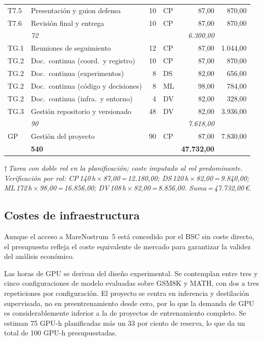 \documentclass[11pt,a4paper]{article}
\begin{document}
{\begin{tabularx}{\textwidth}{>{\ttfamily}l >{\raggedright\arraybackslash}X r l r r}
T7.5 & Presentación y guion defensa & 10 & CP & 87,00 & 870,00 \\
T7.6 & Revisión final y entrega & 10 & CP & 87,00 & 870,00 \\
\multicolumn{2}{r}{\textit{Subtotal F7}} & \textit{72} & & & \textit{6.300,00} \\
\addlinespace[1.5pt]
TG.1 & Reuniones de seguimiento & 12 & CP & 87,00 & 1.044,00 \\
TG.2 & Doc.\ continua (coord.\ y registro) & 10 & CP & 87,00 & 870,00 \\
TG.2 & Doc.\ continua (experimentos) & 8 & DS & 82,00 & 656,00 \\
TG.2 & Doc.\ continua (código y decisiones) & 8 & ML & 98,00 & 784,00 \\
TG.2 & Doc.\ continua (infra.\ y entorno) & 4 & DV & 82,00 & 328,00 \\
TG.3 & Gestión repositorio y versionado & 48 & DV & 82,00 & 3.936,00 \\
\multicolumn{2}{r}{\textit{Subtotal TG}} & \textit{90} & & & \textit{7.618,00} \\
\addlinespace[1.5pt]
GP & Gestión del proyecto & 90 & CP & 87,00 & 7.830,00 \\
\midrule
\multicolumn{2}{r}{\textbf{TOTAL CPA}} & \textbf{540} & & & \textbf{47.732,00} \\
\end{tabularx}
}

\noindent\textit{\scriptsize $\dagger$\,Tarea con doble rol en la planificación; coste imputado al rol predominante. Verificación por rol: CP\,140\,h\,$\times$\,87,00\,=\,12.180,00; DS\,120\,h\,$\times$\,82,00\,=\,9.840,00; ML\,172\,h\,$\times$\,98,00\,=\,16.856,00; DV\,108\,h\,$\times$\,82,00\,=\,8.856,00. Suma\,=\,47.732,00\,\euro{}.}

\subsection{Costes de infraestructura}

Aunque el acceso a MareNostrum~5 está concedido por el BSC sin coste directo, el presupuesto refleja el coste equivalente de mercado para garantizar la validez del análisis económico.

Las horas de GPU se derivan del diseño experimental. Se contemplan entre tres y cinco configuraciones de modelo evaluadas sobre GSM8K y MATH, con dos a tres repeticiones por configuración. El proyecto se centra en inferencia y destilación supervisada, no en preentrenamiento desde cero, por lo que la demanda de GPU es considerablemente inferior a la de proyectos de entrenamiento completo. Se estiman 75 GPU-h planificadas más un 33 por ciento de reserva, lo que da un total de 100 GPU-h presupuestadas.
\end{document}
